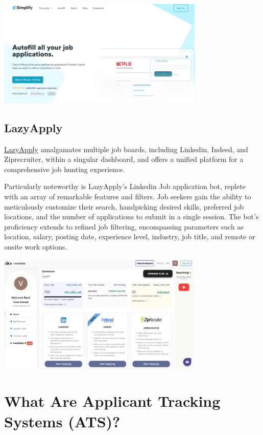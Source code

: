 \documentclass[
]{book}
\begin{document}
\includegraphics[width=3.88542in,height=\textheight]{simplify pic.png}

\hypertarget{lazyapply-1}{%
\section{LazyApply}\label{lazyapply-1}}

\href{https://lazyapply.com/}{LazyApply} amalgamates multiple job boards, including Linkedin, Indeed, and Ziprecruiter, within a singular dashboard, and offers a unified platform for a comprehensive job hunting experience.

Particularly noteworthy is LazyApply's Linkedin Job application bot, replete with an array of remarkable features and filters. Job seekers gain the ability to meticulously customize their search, handpicking desired skills, preferred job locations, and the number of applications to submit in a single session. The bot's proficiency extends to refined job filtering, encompassing parameters such as location, salary, posting date, experience level, industry, job title, and remote or onsite work options.~

\includegraphics[width=3.85417in,height=\textheight]{lazyapply pic 2.png}

\hypertarget{what-are-applicant-tracking-systems-ats}{%
\chapter{What Are Applicant Tracking Systems (ATS)?}\label{what-are-applicant-tracking-systems-ats}}
\end{document}
